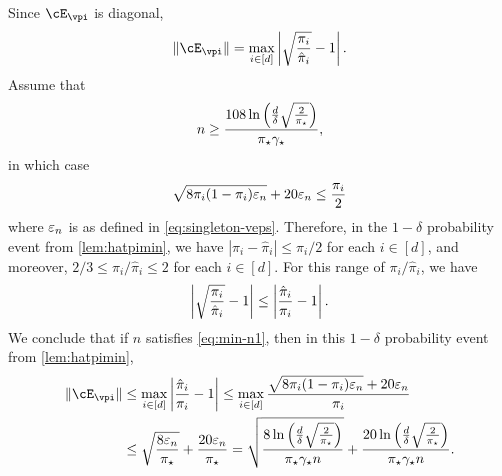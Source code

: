 Since $\errp$ is diagonal,
\begin{align*}
  \norm{\errp}
  = \max_{i\in[d]}
  \Abs{
    \sqrt{\frac{\pi_i}{\hat\pi_i}} - 1
  }
  .
\end{align*}
Assume that
\begin{equation}
  n \geq \frac{108 \ln\left(\frac{d}\delta\sqrt{\frac{2}{\pi_{\star}}}\right)
  }{\pi_{\star}\gamma_{\star}}
  ,
  \label{eq:min-n1}
\end{equation}
in which case
\[
  \sqrt{8\pi_i(1-\pi_i) \varepsilon_n} + 20\varepsilon_n
  \leq \frac{\pi_i}{2}
\]
where $\varepsilon_n$ is as defined in \cref{eq:singleton-veps}.
Therefore, in the $1-\delta$ probability event from
\cref{lem:hatpimin}, we have $|\pi_i - \hat\pi_i| \leq \pi_i/2$ for
each $i \in [d]$, and moreover, $2/3 \leq \pi_i/\hat\pi_i \leq 2$ for
each $i \in [d]$.
For this range of $\pi_i/\hat\pi_i$, we have
\[
  \left| \sqrt{\frac{\pi_i}{\hat\pi_i}} - 1 \right|
  \leq 
  \left| \frac{\hat\pi_i}{\pi_i} - 1 \right|
  .
\]
We conclude that if $n$ satisfies \cref{eq:min-n1}, then in this
$1-\delta$ probability event from \cref{lem:hatpimin},
\begin{align}
  \norm{\errp}
  & \leq
  \max_{i \in [d]}
  \Abs{
    \frac{\hat\pi_i}{\pi_i} - 1
  }
  \leq
  \max_{i \in [d]}
  \frac{
    \sqrt{8\pi_i(1-\pi_i) \veps_n} + 20 \veps_n
  }{\pi_i}
  \notag \\
  & \leq
  \sqrt{\frac{8\veps_n}{\pimin}} + \frac{20\veps_n}{\pimin}
  =
  \sqrt{
    \frac{
      8\ln\Parens{\frac{d}\delta\sqrt{\frac{2}{\pimin}}}
    }{
      \pimin\gap n
    }
  }
  +
  \frac{
    20\ln\Parens{\frac{d}\delta\sqrt{\frac{2}{\pimin}}}
  }{
    \pimin\gap n
  }
  .
  \label{eq:singletonbound}
\end{align}

%
%

